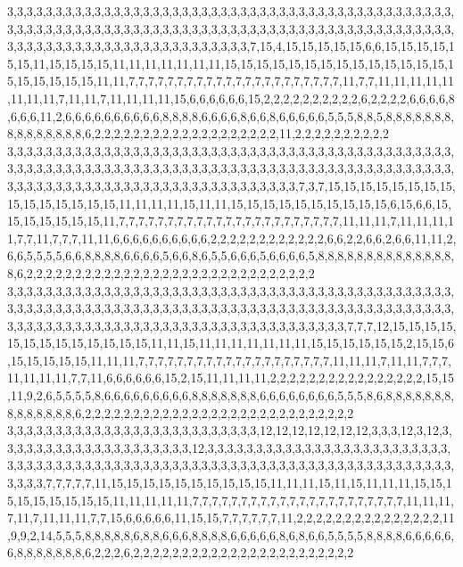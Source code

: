 3,3,3,3,3,3,3,3,3,3,3,3,3,3,3,3,3,3,3,3,3,3,3,3,3,3,3,3,3,3,3,3,3,3,3,3,3,3,3,3,3,3,3,3,3,3,3,3,3,3,3,3,3,3,3,3,3,3,3,3,3,3,3,3,3,3,3,3,3,3,3,3,3,3,3,3,3,3,3,3,3,3,3,3,3,3,3,3,3,3,3,3,3,3,3,3,3,3,3,3,3,3,3,3,3,3,3,3,3,3,3,3,3,3,3,3,3,7,15,4,15,15,15,15,15,6,6,15,15,15,15,15,15,11,15,15,15,15,11,11,11,11,11,11,11,15,15,15,15,15,15,15,15,15,15,15,15,15,15,15,15,15,15,15,15,11,11,7,7,7,7,7,7,7,7,7,7,7,7,7,7,7,7,7,7,7,7,7,7,11,7,7,11,11,11,11,11,11,11,11,7,11,11,7,11,11,11,11,15,6,6,6,6,6,6,15,2,2,2,2,2,2,2,2,2,2,6,2,2,2,2,6,6,6,6,8,6,6,6,11,2,6,6,6,6,6,6,6,6,6,6,8,8,8,8,6,6,6,6,8,6,6,8,6,6,6,6,6,5,5,5,8,8,5,8,8,8,8,8,8,8,8,8,8,8,8,8,8,8,6,2,2,2,2,2,2,2,2,2,2,2,2,2,2,2,2,2,2,2,11,2,2,2,2,2,2,2,2,2,2
3,3,3,3,3,3,3,3,3,3,3,3,3,3,3,3,3,3,3,3,3,3,3,3,3,3,3,3,3,3,3,3,3,3,3,3,3,3,3,3,3,3,3,3,3,3,3,3,3,3,3,3,3,3,3,3,3,3,3,3,3,3,3,3,3,3,3,3,3,3,3,3,3,3,3,3,3,3,3,3,3,3,3,3,3,3,3,3,3,3,3,3,3,3,3,3,3,3,3,3,3,3,3,3,3,3,3,3,3,3,3,3,3,3,3,3,3,3,3,3,3,3,7,3,7,15,15,15,15,15,15,15,15,15,15,15,15,15,15,15,11,11,11,11,15,11,11,15,15,15,15,15,15,15,15,15,15,6,15,6,6,15,15,15,15,15,15,15,11,7,7,7,7,7,7,7,7,7,7,7,7,7,7,7,7,7,7,7,7,7,7,7,11,11,11,7,11,11,11,11,7,7,11,7,7,7,11,11,6,6,6,6,6,6,6,6,6,6,2,2,2,2,2,2,2,2,2,2,2,2,6,6,2,2,6,6,2,6,6,11,11,2,6,6,5,5,5,5,6,6,8,8,8,8,6,6,6,6,5,6,6,8,6,5,5,6,6,6,5,6,6,6,6,5,8,8,8,8,8,8,8,8,8,8,8,8,8,8,8,6,2,2,2,2,2,2,2,2,2,2,2,2,2,2,2,2,2,2,2,2,2,2,2,2,2,2,2,2,2,2
3,3,3,3,3,3,3,3,3,3,3,3,3,3,3,3,3,3,3,3,3,3,3,3,3,3,3,3,3,3,3,3,3,3,3,3,3,3,3,3,3,3,3,3,3,3,3,3,3,3,3,3,3,3,3,3,3,3,3,3,3,3,3,3,3,3,3,3,3,3,3,3,3,3,3,3,3,3,3,3,3,3,3,3,3,3,3,3,3,3,3,3,3,3,3,3,3,3,3,3,3,3,3,3,3,3,3,3,3,3,3,3,3,3,3,3,3,3,3,3,3,3,3,3,3,3,3,7,7,7,12,15,15,15,15,15,15,15,15,15,15,15,15,15,11,11,15,11,11,11,11,11,11,11,15,15,15,15,15,15,2,15,15,6,15,15,15,15,15,11,11,11,7,7,7,7,7,7,7,7,7,7,7,7,7,7,7,7,7,7,7,7,11,11,11,7,11,11,7,7,7,11,11,11,11,7,7,11,6,6,6,6,6,6,15,2,15,11,11,11,11,2,2,2,2,2,2,2,2,2,2,2,2,2,2,2,2,15,15,11,9,2,6,5,5,5,5,8,6,6,6,6,6,6,6,6,6,8,8,8,8,8,8,8,6,6,6,6,6,6,6,6,5,5,5,8,6,8,8,8,8,8,8,8,8,8,8,8,8,8,8,6,2,2,2,2,2,2,2,2,2,2,2,2,2,2,2,2,2,2,2,2,2,2,2,2,2,2,2,2
3,3,3,3,3,3,3,3,3,3,3,3,3,3,3,3,3,3,3,3,3,3,3,3,3,3,12,12,12,12,12,12,12,3,3,3,12,3,12,3,3,3,3,3,3,3,3,3,3,3,3,3,3,3,3,3,3,3,3,12,3,3,3,3,3,3,3,3,3,3,3,3,3,3,3,3,3,3,3,3,3,3,3,3,3,3,3,3,3,3,3,3,3,3,3,3,3,3,3,3,3,3,3,3,3,3,3,3,3,3,3,3,3,3,3,3,3,3,3,3,3,3,3,3,3,3,3,3,3,3,3,3,3,3,3,7,7,7,7,7,11,15,15,15,15,15,15,15,15,15,15,11,11,11,15,11,15,11,11,11,15,15,15,15,15,15,15,15,15,11,11,11,11,11,7,7,7,7,7,7,7,7,7,7,7,7,7,7,7,7,7,7,7,7,7,7,11,11,11,7,11,7,11,11,11,7,7,15,6,6,6,6,6,11,15,15,7,7,7,7,7,7,11,2,2,2,2,2,2,2,2,2,2,2,2,2,2,2,11,9,9,2,14,5,5,5,8,8,8,8,8,6,8,8,6,6,6,8,8,8,8,6,6,6,6,6,8,6,8,6,6,5,5,5,5,8,8,8,8,6,6,6,6,6,6,8,8,8,8,8,8,8,6,2,2,2,6,2,2,2,2,2,2,2,2,2,2,2,2,2,2,2,2,2,2,2,2,2,2,2
